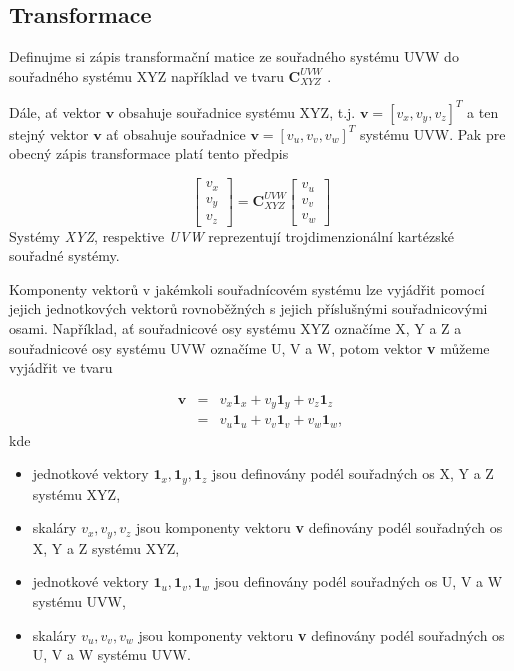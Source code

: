 \documentclass[11pt,a4paper]{article}
\begin{document}
\subsection{Transformace}

Definujme si zápis transformační matice ze souřadného systému UVW do souřadného systému XYZ například ve tvaru $\mathbf{C}_{XYZ}^{UVW}$ \cite{Grewal2001}.

Dále, ať vektor $\mathbf{v}$ obsahuje souřadnice systému XYZ, t.j. $\mathbf{v} = \left[v_{x}, v_{y}, v_{z}\right]^{T}$ a ten stejný vektor $\mathbf{v}$ ať obsahuje souřadnice $\mathbf{v} = \left[v_{u}, v_{v}, v_{w}\right]^{T}$ systému UVW. Pak pre obecný zápis transformace platí tento předpis

\begin{equation}
\begin{bmatrix}
v_{x} \\
v_{y} \\
v_{z}
\end{bmatrix} = \mathbf{C}^{UVW}_{XYZ}
\begin{bmatrix}
v_{u} \\
v_{v} \\
v_{w}
\end{bmatrix}
\label{rov:transGeneral}
\end{equation}
Systémy \textit{XYZ}, respektive \textit{UVW} reprezentují trojdimenzionální kartézské souřadné systémy.

Komponenty vektorů v jakémkoli souřadnícovém systému lze vyjádřit pomocí jejich jednotkových vektorů rovnoběžných s jejich příslušnými souřadnicovými osami. Například, ať souřadnicové osy systému XYZ označíme X, Y a Z a souřadnicové osy systému UVW označíme U, V a W, potom vektor \textbf{v} můžeme vyjádřit ve tvaru

\begin{eqnarray}
\mathbf{v} &=& v_{x}\mathbf{1}_{x} + v_{y}\mathbf{1}_{y} + v_{z}\mathbf{1}_{z} \\ \nonumber
           &=& v_{u}\mathbf{1}_{u} + v_{v}\mathbf{1}_{v} + v_{w}\mathbf{1}_{w}, 
\end{eqnarray}
kde
\begin{itemize}
\item jednotkové vektory $\mathbf{1}_{x}, \mathbf{1}_{y}, \mathbf{1}_{z}$ jsou definovány podél souřadných os X, Y a Z systému XYZ,
\item skaláry $v_{x}, v_{y}, v_{z}$ jsou komponenty vektoru \textbf{v} definovány podél souřadných os X, Y a Z systému XYZ,
\item jednotkové vektory $\mathbf{1}_{u}, \mathbf{1}_{v}, \mathbf{1}_{w}$ jsou definovány podél souřadných os U, V a W systému UVW, 
\item skaláry $v_{u}, v_{v}, v_{w}$ jsou komponenty vektoru \textbf{v} definovány podél souřadných os U, V a W systému UVW. 
\end{itemize}
\end{document}
